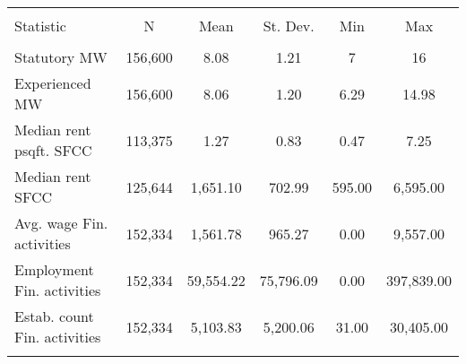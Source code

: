 
\begin{tabular}{@{\extracolsep{5pt}}lccccc} 
\\[-1.8ex]\hline 
\hline \\[-1.8ex] 
Statistic & \multicolumn{1}{c}{N} & \multicolumn{1}{c}{Mean} & \multicolumn{1}{c}{St. Dev.} & \multicolumn{1}{c}{Min} & \multicolumn{1}{c}{Max} \\ 
\hline \\[-1.8ex] 
Statutory MW & 156,600 & 8.08 & 1.21 & 7 & 16 \\ 
Experienced MW & 156,600 & 8.06 & 1.20 & 6.29 & 14.98 \\ 
Median rent psqft. SFCC & 113,375 & 1.27 & 0.83 & 0.47 & 7.25 \\ 
Median rent SFCC & 125,644 & 1,651.10 & 702.99 & 595.00 & 6,595.00 \\ 
Avg. wage Fin. activities & 152,334 & 1,561.78 & 965.27 & 0.00 & 9,557.00 \\ 
Employment Fin. activities & 152,334 & 59,554.22 & 75,796.09 & 0.00 & 397,839.00 \\ 
Estab. count Fin. activities & 152,334 & 5,103.83 & 5,200.06 & 31.00 & 30,405.00 \\ 
\hline \\[-1.8ex] 
\end{tabular} 
